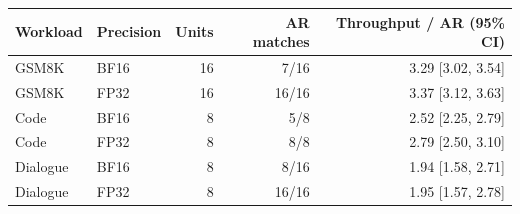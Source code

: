 \begin{tabular}{llrrr}
\toprule
Workload & Precision & Units & AR matches & Throughput / AR (95\% CI) \\
\midrule
GSM8K & BF16 & 16 & 7/16 & 3.29 [3.02, 3.54] \\
GSM8K & FP32 & 16 & 16/16 & 3.37 [3.12, 3.63] \\
Code & BF16 & 8 & 5/8 & 2.52 [2.25, 2.79] \\
Code & FP32 & 8 & 8/8 & 2.79 [2.50, 3.10] \\
Dialogue & BF16 & 8 & 8/16 & 1.94 [1.58, 2.71] \\
Dialogue & FP32 & 8 & 16/16 & 1.95 [1.57, 2.78] \\
\bottomrule
\end{tabular}
